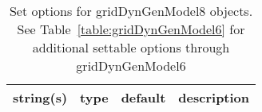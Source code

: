 \begin{table}[ht]
\centering
\begin{tabular}{p{5cm} c c p{7cm}}
\hline
string(s) & type & default & description \\
\hline
\hline
\end{tabular}
\caption{Set options for gridDynGenModel8 objects. See Table~\ref{table:gridDynGenModel6} for additional settable options through gridDynGenModel6}
\label{table:gridDynGenModel8}
\end{table}
